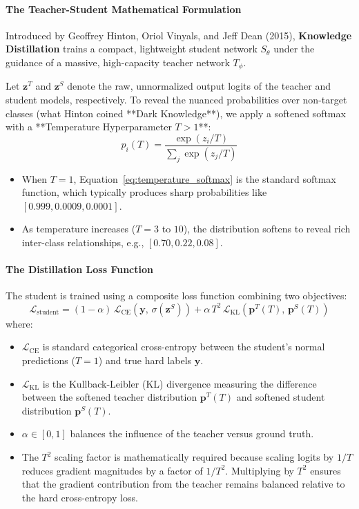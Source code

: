 \paragraph{The Teacher-Student Mathematical Formulation}
Introduced by Geoffrey Hinton, Oriol Vinyals, and Jeff Dean (2015), \textbf{Knowledge Distillation} trains a compact, lightweight student network $S_\theta$ under the guidance of a massive, high-capacity teacher network $T_\phi$.

Let $\mathbf{z}^T$ and $\mathbf{z}^S$ denote the raw, unnormalized output logits of the teacher and student models, respectively. To reveal the nuanced probabilities over non-target classes (what Hinton coined **Dark Knowledge**), we apply a softened softmax with a **Temperature Hyperparameter $T > 1$**:
\begin{equation}
p_i(T) = \frac{\exp(z_i / T)}{\sum_j \exp(z_j / T)}\label{eq:temperature_softmax}
\end{equation}
\begin{itemize}
    \item When $T = 1$, Equation~\eqref{eq:temperature_softmax} is the standard softmax function, which typically produces sharp probabilities like $[0.999, 0.0009, 0.0001]$.
    \item As temperature increases ($T = 3$ to $10$), the distribution softens to reveal rich inter-class relationships, e.g., $[0.70, 0.22, 0.08]$.
\end{itemize}

\paragraph{The Distillation Loss Function}
The student is trained using a composite loss function combining two objectives:
\begin{equation}
\mathcal{L}_{\text{student}} = (1 - \alpha)\,\mathcal{L}_{\text{CE}}\left(\mathbf{y},\, \sigma(\mathbf{z}^S)\right) + \alpha\,T^2\,\mathcal{L}_{\text{KL}}\left( \mathbf{p}^T(T),\, \mathbf{p}^S(T) \right)\label{eq:distillation_loss}
\end{equation}
where:
\begin{itemize}
    \item $\mathcal{L}_{\text{CE}}$ is standard categorical cross-entropy between the student's normal predictions ($T=1$) and true hard labels $\mathbf{y}$.
    \item $\mathcal{L}_{\text{KL}}$ is the Kullback-Leibler (KL) divergence measuring the difference between the softened teacher distribution $\mathbf{p}^T(T)$ and softened student distribution $\mathbf{p}^S(T)$.
    \item $\alpha \in [0, 1]$ balances the influence of the teacher versus ground truth.
    \item The $T^2$ scaling factor is mathematically required because scaling logits by $1/T$ reduces gradient magnitudes by a factor of $1/T^2$. Multiplying by $T^2$ ensures that the gradient contribution from the teacher remains balanced relative to the hard cross-entropy loss.
\end{itemize}

